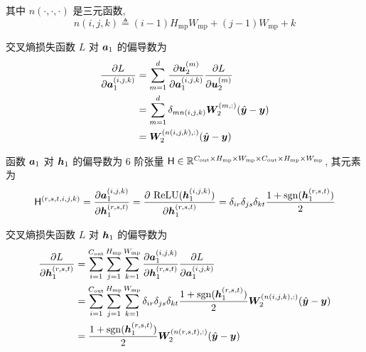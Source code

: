 \documentclass{article}
\begin{document}
其中 $n(\cdot,\cdot,\cdot)$ 是三元函数,
\begin{equation}
  n(i,j,k)\triangleq(i-1)H_{\text{mp}}W_{\text{mp}}+(j-1)W_{\text{mp}}+k
\end{equation}

交叉熵损失函数 $L$ 对 $\bm{a}_1$ 的偏导数为
\begin{equation}
  \begin{aligned}
    \frac{\partial L}{\partial\bm{a}_1^{(i,j,k)}}
    &=\sum_{m=1}^d\frac{\partial\bm{u}_2^{(m)}}{\partial\bm{a}_1^{(i,j,k)}}\frac{\partial L}{\partial\bm{u}_2^{(m)}}\\
    &=\sum_{m=1}^d\delta_{mn(i,j,k)}\bm{W}_2^{(m,:)}(\hat{\bm{y}}-\bm{y})\\
    &=\bm{W}_2^{(n(i,j,k),:)}(\hat{\bm{y}}-\bm{y})\\
  \end{aligned}
\end{equation}

函数 $\bm{a}_1$ 对 $\bm{h}_1$ 的偏导数为 6 阶张量 $\mathsf{H}\in\mathbb{R}^{C_{\text{out}}\times H_{\text{mp}}\times W_{\text{mp}}\times C_{\text{out}}\times H_{\text{mp}}\times W_{\text{mp}}}$, 其元素为
\begin{equation}
  \mathsf{H}^{(r,s,t,i,j,k)}
  =\frac{\partial\bm{a}_1^{(i,j,k)}}{\partial\bm{h}_1^{(r,s,t)}}
  =\frac{\partial~\mathrm{ReLU}(\bm{h}_1^{(i,j,k)})}{\partial\bm{h}_1^{(r,s,t)}}
  =\delta_{ir}\delta_{js}\delta_{kt}\frac{1+\operatorname{sgn}(\bm{h}_1^{(r,s,t)})}{2}
\end{equation}

交叉熵损失函数 $L$ 对 $\bm{h}_1$ 的偏导数为
\begin{equation}
  \begin{aligned}
    \frac{\partial L}{\partial\bm{h}_1^{(r,s,t)}}
    &=\sum_{i=1}^{C_{\text{out}}}\sum_{j=1}^{H_{\text{mp}}}\sum_{k=1}^{W_{\text{mp}}}\frac{\partial\bm{a}_1^{(i,j,k)}}{\partial\bm{h}_1^{(r,s,t)}}\frac{\partial L}{\partial\bm{a}_1^{(i,j,k)}}\\
    &=\sum_{i=1}^{C_{\text{out}}}\sum_{j=1}^{H_{\text{mp}}}\sum_{k=1}^{W_{\text{mp}}}\delta_{ir}\delta_{js}\delta_{kt}\frac{1+\operatorname{sgn}(\bm{h}_1^{(r,s,t)})}{2}\bm{W}_2^{(n(i,j,k),:)}(\hat{\bm{y}}-\bm{y})\\
    &=\frac{1+\operatorname{sgn}(\bm{h}_1^{(r,s,t)})}{2}\bm{W}_2^{(n(r,s,t),:)}(\hat{\bm{y}}-\bm{y})
  \end{aligned}
\end{equation}
\end{document}
